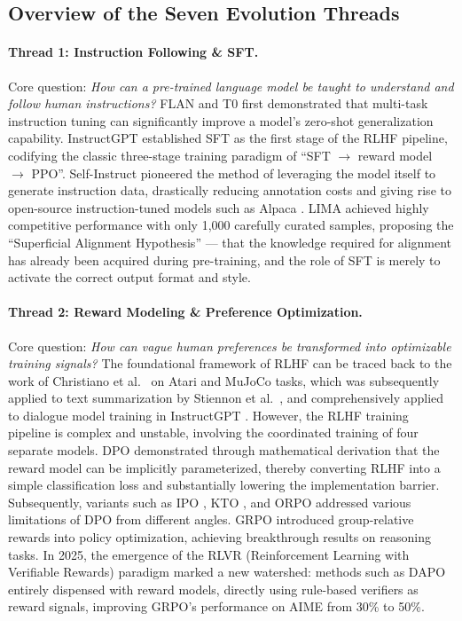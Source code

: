 \subsection{Overview of the Seven Evolution Threads}
\label{sec:t0-threads}

\paragraph{Thread 1: Instruction Following \& SFT.}
Core question: \textit{How can a pre-trained language model be taught to understand and follow human instructions?}
FLAN \cite{wei2022flan} and T0 \cite{sanh2022multitask} first demonstrated that
multi-task instruction tuning can significantly improve a model's zero-shot generalization capability.
InstructGPT \cite{ouyang2022instructgpt} established SFT as the first stage of the RLHF pipeline,
codifying the classic three-stage training paradigm of ``SFT $\rightarrow$ reward model $\rightarrow$ PPO''.
Self-Instruct \cite{wang2023selfinstruct} pioneered the method of leveraging the model itself to generate instruction data,
drastically reducing annotation costs and giving rise to open-source instruction-tuned models such as Alpaca \cite{taori2023alpaca}.
LIMA \cite{zhou2023lima} achieved highly competitive performance with only 1,000 carefully curated samples,
proposing the ``Superficial Alignment Hypothesis'' --- that the knowledge required for alignment has already been acquired during pre-training,
and the role of SFT is merely to activate the correct output format and style.

\paragraph{Thread 2: Reward Modeling \& Preference Optimization.}
Core question: \textit{How can vague human preferences be transformed into optimizable training signals?}
The foundational framework of RLHF can be traced back to
the work of Christiano et al.\ \cite{christiano2017rlhf} on Atari and MuJoCo tasks,
which was subsequently applied to text summarization by Stiennon et al.\ \cite{stiennon2020summarize},
and comprehensively applied to dialogue model training in InstructGPT \cite{ouyang2022instructgpt}.
However, the RLHF training pipeline is complex and unstable, involving the coordinated training of four separate models.
DPO \cite{rafailov2023dpo} demonstrated through mathematical derivation that the reward model can be implicitly parameterized,
thereby converting RLHF into a simple classification loss and substantially lowering the implementation barrier.
Subsequently, variants such as IPO \cite{azar2023ipo}, KTO \cite{ethayarajh2024kto},
and ORPO \cite{hong2024orpo} addressed various limitations of DPO from different angles.
GRPO \cite{shao2024grpo} introduced group-relative rewards into policy optimization,
achieving breakthrough results on reasoning tasks.
In 2025, the emergence of the RLVR (Reinforcement Learning with Verifiable Rewards) paradigm
marked a new watershed: methods such as DAPO \cite{yu2025dapo} entirely dispensed with reward models,
directly using rule-based verifiers as reward signals, improving GRPO's performance on AIME from 30\% to 50\%.

